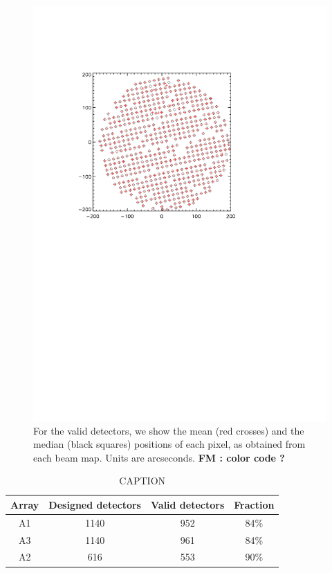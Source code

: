 \begin{figure}[htp]
\begin{center}
\includegraphics[trim=2cm 14cm 5cm 4cm, clip=true,width=0.55\linewidth]{Figures/A2_test_positions.pdf}
\caption{For the valid detectors,
  we show the mean (red crosses) and the median (black squares)
  positions of each pixel, as obtained from each beam map.
  Units are arcseconds. {\bf FM : color code ?}}
\label{fig:mean_vs_median}
\end{center}
\end{figure}


\begin{table}[ht]
\begin{center}  
  \begin{tabular}{|c|c|c|c|}
    \hline
    Array & Designed detectors &  Valid detectors & Fraction\\
    \hline\hline
    A1 & 1140 & 952 &  84\%\\
    A3 & 1140 & 961 &  84\%\\
    A2 & 616  & 553 &  90\%\\
    \hline
  \end{tabular}
  \caption{ CAPTION}
  \label{tab:number_of_kids}
\end{center}    
\end{table}
